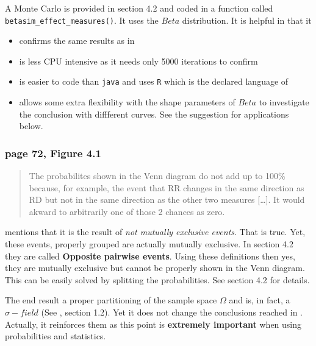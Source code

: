 \documentclass[
]{book}
\providecommand{\tightlist}{%
  \setlength{\itemsep}{0pt}\setlength{\parskip}{0pt}}
\theoremstyle{definition}
\theoremstyle{definition}
\theoremstyle{definition}
\theoremstyle{definition}
\theoremstyle{remark}
\begin{document}
A Monte Carlo is provided in section 4.2 and coded in a function
called \texttt{betasim\_effect\_measures()}. It uses the \(Beta\) distribution. It is
helpful in that it

\begin{itemize}
\tightlist
\item
  confirms the same results as in \citet{shanninbrumback2021}
\item
  is less CPU intensive as it needs only 5000 iterations to confirm \citet{shanninbrumback2021}
\item
  is easier to code than \texttt{java} and uses \texttt{R} which is the declared language of
  \citet{brumback2022}
\item
  allows some extra flexibility with the shape parameters of \(Beta\) to investigate
  the conclusion with diffferent curves. See the suggestion for applications below.
\end{itemize}

\hypertarget{page-72-figure-4.1}{%
\subsubsection*{page 72, Figure 4.1}\label{page-72-figure-4.1}}

\begin{quote}
The probabilites shown in the Venn diagram do not add up to 100\% because,
for example, the event that RR changes in the same direction as RD but not in
the same direction as the other two measures {[}\ldots{]}. It would akward to
arbitrarily one of those 2 chances as zero.
\end{quote}

\citet{shanninbrumback2021} mentions that it is the result of \emph{not mutually
exclusive events}. That is true. Yet, these events, properly grouped are actually
mutually exclusive. In section 4.2 they are called \textbf{Opposite pairwise events}.
Using these definitions then yes, they are mutually exclusive but
cannot be properly shown in the Venn diagram. This can be easily solved
by splitting the probabilities. See section 4.2 for details.

The end result a proper partitioning of the sample space \(\Omega\) and is,
in fact, a \(\sigma-field\) (See \citet{grimmett}, section 1.2). Yet it does not change the
conclusions reached in \citet{shanninbrumback2021}. Actually, it reinforces them as
this point is \textbf{extremely important} when using probabilities and statistics.
\end{document}
